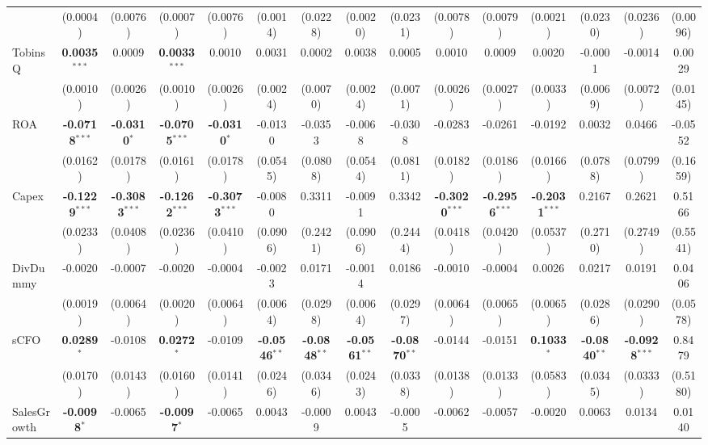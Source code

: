 \begin{landscape}
\begin{table}[H]
\begin{tabular}{lcccccccccccccc}
 & (0.0004) & (0.0076) & (0.0007) & (0.0076) & (0.0014) & (0.0228) & (0.0020) & (0.0231) & (0.0078) & (0.0079) & (0.0021) & (0.0230) & (0.0236) & (0.0096) \\
TobinsQ & \textbf{0.0035}$^{***}$ & 0.0009 & \textbf{0.0033}$^{***}$ & 0.0010 & 0.0031 & 0.0002 & 0.0038 & 0.0005 & 0.0010 & 0.0009 & 0.0020 & -0.0001 & -0.0014 & 0.0029 \\
 & (0.0010) & (0.0026) & (0.0010) & (0.0026) & (0.0024) & (0.0070) & (0.0024) & (0.0071) & (0.0026) & (0.0027) & (0.0033) & (0.0069) & (0.0072) & (0.0145) \\
ROA & \textbf{-0.0718}$^{***}$ & \textbf{-0.0310}$^{*}$ & \textbf{-0.0705}$^{***}$ & \textbf{-0.0310}$^{*}$ & -0.0130 & -0.0353 & -0.0068 & -0.0308 & -0.0283 & -0.0261 & -0.0192 & 0.0032 & 0.0466 & -0.0552 \\
 & (0.0162) & (0.0178) & (0.0161) & (0.0178) & (0.0545) & (0.0808) & (0.0544) & (0.0811) & (0.0182) & (0.0186) & (0.0166) & (0.0788) & (0.0799) & (0.1659) \\
Capex & \textbf{-0.1229}$^{***}$ & \textbf{-0.3083}$^{***}$ & \textbf{-0.1262}$^{***}$ & \textbf{-0.3073}$^{***}$ & -0.0080 & 0.3311 & -0.0091 & 0.3342 & \textbf{-0.3020}$^{***}$ & \textbf{-0.2956}$^{***}$ & \textbf{-0.2031}$^{***}$ & 0.2167 & 0.2621 & 0.5166 \\
 & (0.0233) & (0.0408) & (0.0236) & (0.0410) & (0.0906) & (0.2421) & (0.0906) & (0.2444) & (0.0418) & (0.0420) & (0.0537) & (0.2710) & (0.2749) & (0.5541) \\
DivDummy & -0.0020 & -0.0007 & -0.0020 & -0.0004 & -0.0023 & 0.0171 & -0.0014 & 0.0186 & -0.0010 & -0.0004 & 0.0026 & 0.0217 & 0.0191 & 0.0406 \\
 & (0.0019) & (0.0064) & (0.0020) & (0.0064) & (0.0064) & (0.0298) & (0.0064) & (0.0297) & (0.0064) & (0.0065) & (0.0065) & (0.0286) & (0.0290) & (0.0578) \\
sCFO & \textbf{0.0289}$^{*}$ & -0.0108 & \textbf{0.0272}$^{*}$ & -0.0109 & \textbf{-0.0546}$^{**}$ & \textbf{-0.0848}$^{**}$ & \textbf{-0.0561}$^{**}$ & \textbf{-0.0870}$^{**}$ & -0.0144 & -0.0151 & \textbf{0.1033}$^{*}$ & \textbf{-0.0840}$^{**}$ & \textbf{-0.0928}$^{***}$ & 0.8479 \\
 & (0.0170) & (0.0143) & (0.0160) & (0.0141) & (0.0246) & (0.0346) & (0.0243) & (0.0338) & (0.0138) & (0.0133) & (0.0583) & (0.0345) & (0.0333) & (0.5180) \\
SalesGrowth & \textbf{-0.0098}$^{*}$ & -0.0065 & \textbf{-0.0097}$^{*}$ & -0.0065 & 0.0043 & -0.0009 & 0.0043 & -0.0005 & -0.0062 & -0.0057 & -0.0020 & 0.0063 & 0.0134 & 0.0140 \\

\end{tabular}
\end{table}
\end{landscape}

